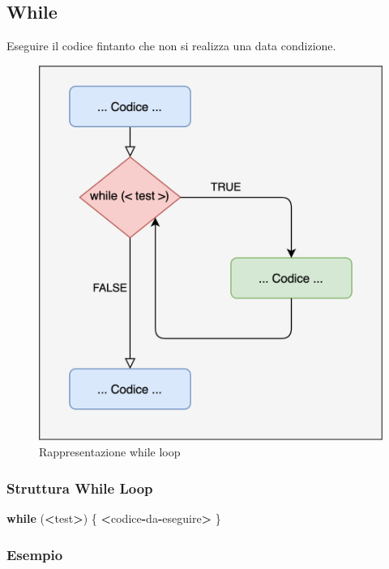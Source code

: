 \documentclass[
]{book}
\newenvironment{Shaded}{\begin{snugshade}}{\end{snugshade}}
\newcommand{\ControlFlowTok}[1]{\textcolor[rgb]{0.13,0.29,0.53}{\textbf{#1}}}
\newcommand{\NormalTok}[1]{#1}
\newcommand{\OperatorTok}[1]{\textcolor[rgb]{0.81,0.36,0.00}{\textbf{#1}}}
\begin{document}
\hypertarget{while}{%
\subsection{While}\label{while}}

Eseguire il codice fintanto che non si realizza una data condizione.

\begin{figure}

{\centering \includegraphics[width=0.65\linewidth]{images/while_loop} 

}

\caption{Rappresentazione while loop}\label{fig:plot-while-loop}
\end{figure}

\hypertarget{struttura-while-loop}{%
\subsubsection*{Struttura While Loop}\label{struttura-while-loop}}

\begin{Shaded}
\begin{Highlighting}[]
\ControlFlowTok{while}\NormalTok{ (}\OperatorTok{<}\NormalTok{test}\OperatorTok{>}\NormalTok{) \{}
    \OperatorTok{<}\NormalTok{codice}\OperatorTok{-}\NormalTok{da}\OperatorTok{-}\NormalTok{eseguire}\OperatorTok{>}
\NormalTok{\}}
\end{Highlighting}
\end{Shaded}

\hypertarget{esempio-6}{%
\subsubsection*{Esempio}\label{esempio-6}}
\end{document}
